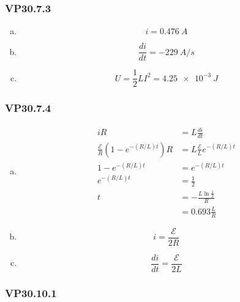 \documentclass{article}
\begin{document}
\subsubsection{VP30.7.3}

\begin{enumerate}[(a)]
  \item \[i = \qty{0.476}{A}\]

  \item \[\frac{di}{dt} = \qty{-229}{A/s}\]

  \item \[U = \frac{1}{2} L I^2 = \qty{4.25e-3}{J}\]
\end{enumerate}

\subsubsection{VP30.7.4}

\begin{enumerate}[(a)]
  \item

        \begin{align*}
          i R                                          & = L \frac{di}{dt}                        \\
          \frac{\mathcal{E}}{R} (1 - e^{-(R / L) t}) R & = L \frac{\mathcal{E}}{L} e^{-(R / L) t} \\
          1 - e^{-(R / L) t}                           & = e^{-(R / L) t}                         \\
          e^{-(R / L) t}                               & = \frac{1}{2}                            \\
          t                                            & = -\frac{L \ln \frac{1}{2}}{R}           \\
                                                       & = 0.693 \frac{L}{R}
        \end{align*}

  \item \[i = \frac{\mathcal{E}}{2 R}\]

  \item \[\frac{di}{dt} = \frac{\mathcal{E}}{2 L}\]
\end{enumerate}

\subsubsection{VP30.10.1}
\end{document}

